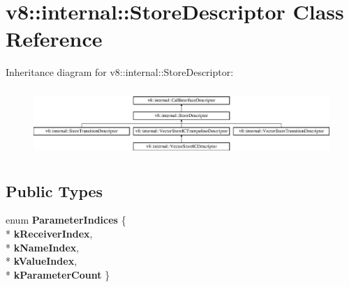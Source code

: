 \hypertarget{classv8_1_1internal_1_1_store_descriptor}{}\section{v8\+:\+:internal\+:\+:Store\+Descriptor Class Reference}
\label{classv8_1_1internal_1_1_store_descriptor}
Inheritance diagram for v8\+:\+:internal\+:\+:Store\+Descriptor\+:\begin{figure}[H]
\begin{center}
\leavevmode
\includegraphics[height=2.583622cm]{classv8_1_1internal_1_1_store_descriptor}
\end{center}
\end{figure}
\subsection*{Public Types}
\begin{DoxyCompactItemize}
\item 
enum {\bfseries Parameter\+Indices} \{ \\*
{\bfseries k\+Receiver\+Index}, 
\\*
{\bfseries k\+Name\+Index}, 
\\*
{\bfseries k\+Value\+Index}, 
\\*
{\bfseries k\+Parameter\+Count}
 \}\hypertarget{classv8_1_1internal_1_1_store_descriptor_a5e51c6b5e7cf118b0e33a6919f6bdb85}{}\label{classv8_1_1internal_1_1_store_descriptor_a5e51c6b5e7cf118b0e33a6919f6bdb85}

\end{DoxyCompactItemize}
